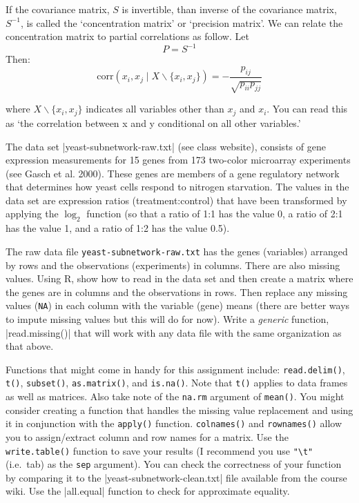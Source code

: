 If the covariance matrix, $S$ is invertible, than inverse of the
covariance matrix, $S^{-1}$, is called the `concentration matrix' or
`precision matrix'. We can relate the concentration matrix to partial
correlations as follow. Let 
\[
P = S^{-1}
\]
Then:
\[
\mbox{corr}(x_i,x_j \mid X \backslash \{x_i,x_j\}) = -\frac{p_{ij}}{\sqrt{p_{ii} p_{jj}}}
\]

where $X \backslash \{x_i,x_j\}$ indicates all variables other than
$x_j$ and $x_i$. You can read this as `the correlation between x and y
conditional on all other variables.'

\medskip
\begin{assignment}
\small
The data set |yeast-subnetwork-raw.txt| (see class website), consists of gene expression measurements
for 15 genes from 173 two-color microarray experiments (see Gasch et al.
2000). These genes are members of a gene regulatory network that determines how yeast cells
respond to nitrogen starvation. The values in the data set are
expression ratios (treatment:control) that have been transformed by
applying the $\log_2$ function (so that a ratio of 1:1 has the value 0,
a ratio of 2:1 has the value 1, and a ratio of 1:2 has the value 0.5).    
    
\par\medskip    
The raw data file
\lstinline!yeast-subnetwork-raw.txt! has the genes (variables) arranged
by rows and the observations (experiments) in columns. There are also
missing values. Using R, show how to read in the data set and then
create a matrix where the genes are in columns and the observations in
rows. Then replace any missing values (\lstinline!NA!) in each column
with the variable (gene) means (there are better ways to impute missing
values but this will do for now). Write a \emph{generic} function, |read.missing()| that will work with any data file with the same organization as that above.

\par\medskip
Functions that might come in handy for this assignment 
include: \lstinline!read.delim()!, \lstinline!t()!, \lstinline!subset()!,
\lstinline!as.matrix()!, and \lstinline!is.na()!. Note that
\lstinline!t()! applies to data frames as well as matrices. Also take
note of the \lstinline!na.rm! argument of \lstinline!mean()!. You might consider creating a function that handles the missing value
replacement and using it in conjunction with the \lstinline!apply()!
function. \lstinline!colnames()! and \lstinline!rownames()! allow you to
assign/extract column and row names for a matrix. Use the
\lstinline!write.table()! function to save your results (I recommend you
use \lstinline!"\t"! (i.e.~tab) as the \lstinline!sep! argument). You can check the correctness of your function by comparing it to the |yeast-subnetwork-clean.txt| file available from the course wiki. Use the |all.equal| function to check for approximate equality.
\end{assignment}


